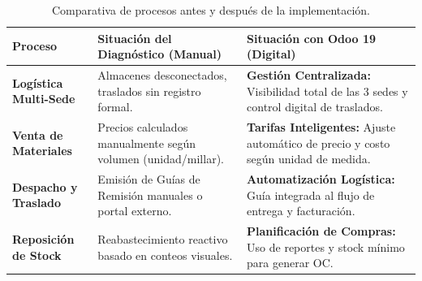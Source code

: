 \begin{table}[H]
    \centering
    \footnotesize
    \begin{tabular}{|p{3cm}|p{5.5cm}|p{5.5cm}|}
        \hline
        \textbf{Proceso} & \textbf{Situación del Diagnóstico (Manual)} & \textbf{Situación con Odoo 19 (Digital)} \\ \hline
        \textbf{Logística Multi-Sede} & Almacenes desconectados, traslados sin registro formal. & \textbf{Gestión Centralizada:} Visibilidad total de las 3 sedes y control digital de traslados. \\ \hline
        \textbf{Venta de Materiales} & Precios calculados manualmente según volumen (unidad/millar). & \textbf{Tarifas Inteligentes:} Ajuste automático de precio y costo según unidad de medida. \\ \hline
        \textbf{Despacho y Traslado} & Emisión de Guías de Remisión manuales o portal externo. & \textbf{Automatización Logística:} Guía integrada al flujo de entrega y facturación. \\ \hline
        \textbf{Reposición de Stock} & Reabastecimiento reactivo basado en conteos visuales. & \textbf{Planificación de Compras:} Uso de reportes y stock mínimo para generar OC. \\ \hline
    \end{tabular}
    \caption{Comparativa de procesos antes y después de la implementación.}
    \label{tab:comparativa}
\end{table}
\FloatBarrier
